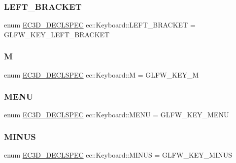\subsubsection{\texorpdfstring{L\+E\+F\+T\+\_\+\+B\+R\+A\+C\+K\+ET}{LEFT\_BRACKET}}
{\footnotesize\ttfamily enum \mbox{\hyperlink{_common_8h_aac42573e202ca3dd4d259c81691e2369}{E\+C3\+D\+\_\+\+D\+E\+C\+L\+S\+P\+EC}} ec\+::\+Keyboard\+::\+L\+E\+F\+T\+\_\+\+B\+R\+A\+C\+K\+ET = G\+L\+F\+W\+\_\+\+K\+E\+Y\+\_\+\+L\+E\+F\+T\+\_\+\+B\+R\+A\+C\+K\+ET}

\mbox{\label{classec_1_1_keyboard_ae9723063b666c0dd21e96588ebb734c9}} 
\subsubsection{\texorpdfstring{M}{M}}
{\footnotesize\ttfamily enum \mbox{\hyperlink{_common_8h_aac42573e202ca3dd4d259c81691e2369}{E\+C3\+D\+\_\+\+D\+E\+C\+L\+S\+P\+EC}} ec\+::\+Keyboard\+::M = G\+L\+F\+W\+\_\+\+K\+E\+Y\+\_\+M}

\mbox{\label{classec_1_1_keyboard_a427a782cc88310ca19c3b265d1501258}} 
\subsubsection{\texorpdfstring{M\+E\+NU}{MENU}}
{\footnotesize\ttfamily enum \mbox{\hyperlink{_common_8h_aac42573e202ca3dd4d259c81691e2369}{E\+C3\+D\+\_\+\+D\+E\+C\+L\+S\+P\+EC}} ec\+::\+Keyboard\+::\+M\+E\+NU = G\+L\+F\+W\+\_\+\+K\+E\+Y\+\_\+\+M\+E\+NU}

\mbox{\label{classec_1_1_keyboard_a3891ae964cb95fefde0f6368378062ce}} 
\subsubsection{\texorpdfstring{M\+I\+N\+US}{MINUS}}
{\footnotesize\ttfamily enum \mbox{\hyperlink{_common_8h_aac42573e202ca3dd4d259c81691e2369}{E\+C3\+D\+\_\+\+D\+E\+C\+L\+S\+P\+EC}} ec\+::\+Keyboard\+::\+M\+I\+N\+US = G\+L\+F\+W\+\_\+\+K\+E\+Y\+\_\+\+M\+I\+N\+US}

